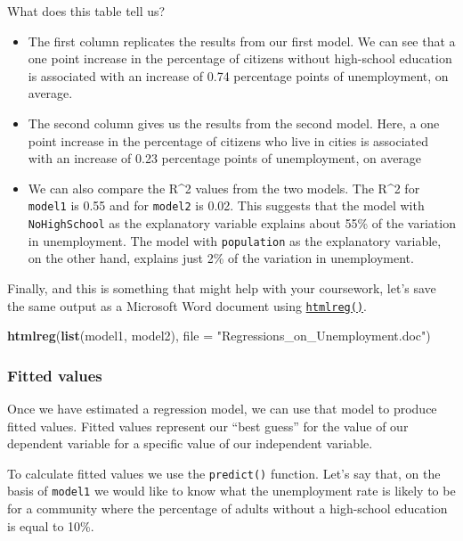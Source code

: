 \documentclass[]{article}
\newenvironment{Shaded}{\begin{snugshade}}{\end{snugshade}}
\newcommand{\KeywordTok}[1]{\textcolor[rgb]{0.13,0.29,0.53}{\textbf{#1}}}
\newcommand{\DataTypeTok}[1]{\textcolor[rgb]{0.13,0.29,0.53}{#1}}
\newcommand{\StringTok}[1]{\textcolor[rgb]{0.31,0.60,0.02}{#1}}
\newcommand{\NormalTok}[1]{#1}
\providecommand{\tightlist}{%
  \setlength{\itemsep}{0pt}\setlength{\parskip}{0pt}}
\theoremstyle{definition}
\theoremstyle{definition}
\theoremstyle{definition}
\theoremstyle{remark}
\begin{document}
What does this table tell us?

\begin{itemize}
\tightlist
\item
  The first column replicates the results from our first model. We can
  see that a one point increase in the percentage of citizens without
  high-school education is associated with an increase of 0.74
  percentage points of unemployment, on average.
\item
  The second column gives us the results from the second model. Here, a
  one point increase in the percentage of citizens who live in cities is
  associated with an increase of 0.23 percentage points of unemployment,
  on average
\item
  We can also compare the R\^{}2 values from the two models. The R\^{}2
  for \texttt{model1} is 0.55 and for \texttt{model2} is 0.02. This
  suggests that the model with \texttt{NoHighSchool} as the explanatory
  variable explains about 55\% of the variation in unemployment. The
  model with \texttt{population} as the explanatory variable, on the
  other hand, explains just 2\% of the variation in unemployment.
\end{itemize}

Finally, and this is something that might help with your coursework,
let's save the same output as a Microsoft Word document using
\href{http://bit.ly/R_texreg}{\texttt{htmlreg()}}.

\begin{Shaded}
\begin{Highlighting}[]
\KeywordTok{htmlreg}\NormalTok{(}\KeywordTok{list}\NormalTok{(model1, model2), }\DataTypeTok{file =} \StringTok{"Regressions_on_Unemployment.doc"}\NormalTok{)}
\end{Highlighting}
\end{Shaded}

\subsubsection{Fitted values}\label{fitted-values}

Once we have estimated a regression model, we can use that model to
produce fitted values. Fitted values represent our ``best guess'' for
the value of our dependent variable for a specific value of our
independent variable.

To calculate fitted values we use the \texttt{predict()} function. Let's
say that, on the basis of \texttt{model1} we would like to know what the
unemployment rate is likely to be for a community where the percentage
of adults without a high-school education is equal to 10\%.
\end{document}
